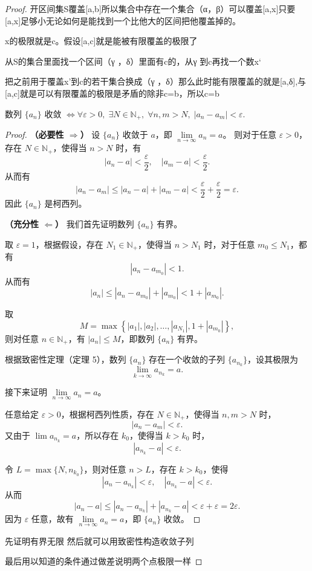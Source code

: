 \documentclass[lang=cn,10pt]{elegantbook}
\begin{document}
\begin{proof}
开区间集S覆盖[a,b]所以集合中存在一个集合（α，β）可以覆盖[a,x]只要[a,x]足够小无论如何是能找到一个比他大的区间把他覆盖掉的。

x的极限就是c。假设[a,c]就是能被有限覆盖的极限了

从S的集合里面找一个区间（γ ，δ）里面有c的，从γ 到c再找一个数x‘

把之前用于覆盖x’到c的若干集合换成（γ ，δ）那么此时能有限覆盖的就是[a,δ],与[a,c]就是可以有限覆盖的极限是矛盾的除非c=b，所以c=b\\
\begin{theorem}[柯西收敛准则]
数列 $\{a_n\}$ 收敛 $\Longleftrightarrow \forall \varepsilon > 0,\; \exists N \in \mathbb{N}_+,\; \forall n, m > N,\; |a_n - a_m| < \varepsilon$.
\end{theorem}

\begin{proof}
\textbf{（必要性 $\Rightarrow$）}  
设 $\{a_n\}$ 收敛于 $a$，即 $\lim\limits_{n\to\infty} a_n = a$。  
则对于任意 $\varepsilon > 0$，存在 $N \in \mathbb{N}_+$，使得当 $n > N$ 时，有
\[
|a_n - a| < \frac{\varepsilon}{2},\quad |a_m - a| < \frac{\varepsilon}{2}.
\]
从而有
\[
|a_n - a_m| \leq |a_n - a| + |a_m - a| < \frac{\varepsilon}{2} + \frac{\varepsilon}{2} = \varepsilon.
\]
因此 $\{a_n\}$ 是柯西列。

\medskip

\textbf{（充分性 $\Leftarrow$）}  
我们首先证明数列 $\{a_n\}$ 有界。

取 $\varepsilon = 1$，根据假设，存在 $N_1 \in \mathbb{N}_+$，使得当 $n > N_1$ 时，对于任意 $m_0 \leq N_1$，都有
\[
|a_n - a_{m_0}| < 1.
\]
从而有
\[
|a_n| \leq |a_n - a_{m_0}| + |a_{m_0}| < 1 + |a_{m_0}|.
\]

取
\[
M = \max\left\{ |a_1|, |a_2|, \dots, |a_{N_1}|, 1 + |a_{m_0}| \right\},
\]
则对任意 $n \in \mathbb{N}_+$，有 $|a_n| \leq M$，即数列 $\{a_n\}$ 有界。

根据致密性定理（定理 5），数列 $\{a_n\}$ 存在一个收敛的子列 $\{a_{n_k}\}$，设其极限为
\[
\lim_{k \to \infty} a_{n_k} = a.
\]

接下来证明 $\lim\limits_{n\to\infty} a_n = a$。

任意给定 $\varepsilon > 0$，根据柯西列性质，存在 $N \in \mathbb{N}_+$，使得当 $n, m > N$ 时，
\[
|a_n - a_m| < \varepsilon.
\]
又由于 $\lim a_{n_k} = a$，所以存在 $k_0$，使得当 $k > k_0$ 时，
\[
|a_{n_k} - a| < \varepsilon.
\]

令 $L = \max\{N, n_{k_0}\}$，则对任意 $n > L$，存在 $k > k_0$，使得
\[
|a_n - a_{n_k}| < \varepsilon,\quad |a_{n_k} - a| < \varepsilon.
\]
从而
\[
|a_n - a| \leq |a_n - a_{n_k}| + |a_{n_k} - a| < \varepsilon + \varepsilon = 2\varepsilon.
\]
因为 $\varepsilon$ 任意，故有 $\lim\limits_{n\to\infty} a_n = a$，即 $\{a_n\}$ 收敛。

\end{proof}
先证明有界无限 然后就可以用致密性构造收敛子列

最后用以知道的条件通过做差说明两个点极限一样

\end{proof}
\end{document}
